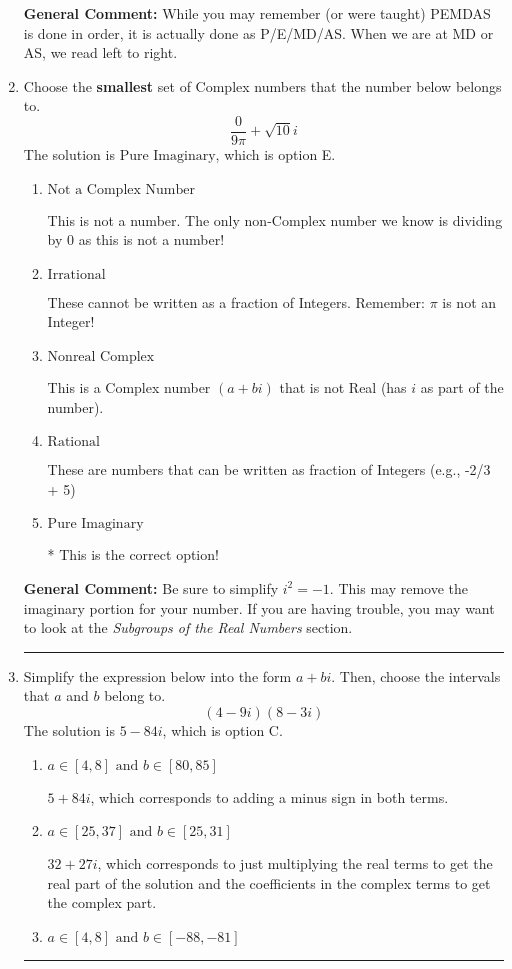 \documentclass{extbook}[14pt]
\newcommand{\litem}[1]{\item #1

\rule{\textwidth}{0.4pt}}
\begin{document}
\begin{enumerate}
{\textbf{General Comment:} While you may remember (or were taught) PEMDAS is done in order, it is actually done as P/E/MD/AS. When we are at MD or AS, we read left to right.
}
\litem{
Choose the \textbf{smallest} set of Complex numbers that the number below belongs to.
\[ \frac{0}{9 \pi}+\sqrt{10}i \]The solution is \( \text{Pure Imaginary} \), which is option E.\begin{enumerate}[label=\Alph*.]
\item \( \text{Not a Complex Number} \)

This is not a number. The only non-Complex number we know is dividing by 0 as this is not a number!
\item \( \text{Irrational} \)

These cannot be written as a fraction of Integers. Remember: $\pi$ is not an Integer!
\item \( \text{Nonreal Complex} \)

This is a Complex number $(a+bi)$ that is not Real (has $i$ as part of the number).
\item \( \text{Rational} \)

These are numbers that can be written as fraction of Integers (e.g., -2/3 + 5)
\item \( \text{Pure Imaginary} \)

* This is the correct option!
\end{enumerate}

\textbf{General Comment:} Be sure to simplify $i^2 = -1$. This may remove the imaginary portion for your number. If you are having trouble, you may want to look at the \textit{Subgroups of the Real Numbers} section.
}
\litem{
Simplify the expression below into the form $a+bi$. Then, choose the intervals that $a$ and $b$ belong to.
\[ (4 - 9 i)(8 - 3 i) \]The solution is \( 5 - 84 i \), which is option C.\begin{enumerate}[label=\Alph*.]
\item \( a \in [4, 8] \text{ and } b \in [80, 85] \)

 $5 + 84 i$, which corresponds to adding a minus sign in both terms.
\item \( a \in [25, 37] \text{ and } b \in [25, 31] \)

 $32 + 27 i$, which corresponds to just multiplying the real terms to get the real part of the solution and the coefficients in the complex terms to get the complex part.
\item \( a \in [4, 8] \text{ and } b \in [-88, -81] \)


\end{enumerate}}
\end{enumerate}
\end{document}

